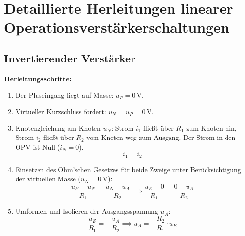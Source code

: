 \documentclass[11pt,a4paper]{article}
\begin{document}
\newpage

\section{Detaillierte Herleitungen linearer Operationsverstärkerschaltungen}

\subsection{Invertierender Verstärker}
\textbf{Herleitungsschritte:}
\begin{enumerate}
    \item Der Pluseingang liegt auf Masse: $u_P = 0\,\text{V}$.
    \item Virtueller Kurzschluss fordert: $u_N = u_P = 0\,\text{V}$.
    \item Knotengleichung am Knoten $u_N$: Strom $i_1$ fließt über $R_1$ zum Knoten hin, Strom $i_2$ fließt über $R_2$ vom Knoten weg zum Ausgang. Der Strom in den OPV ist Null ($i_N = 0$).
    \begin{equation}
    i_1 = i_2
    \end{equation}
    \item Einsetzen des Ohm'schen Gesetzes für beide Zweige unter Berücksichtigung der virtuellen Masse ($u_N = 0\,\text{V}$):
    \begin{equation}
    \frac{u_E - u_N}{R_1} = \frac{u_N - u_A}{R_2} \implies \frac{u_E - 0}{R_1} = \frac{0 - u_A}{R_2}
    \end{equation}
    \item Umformen und Isolieren der Ausgangsspannung $u_A$:
    \begin{equation}
    \frac{u_E}{R_1} = -\frac{u_A}{R_2} \implies u_A = -\frac{R_2}{R_1} \cdot u_E
    \end{equation}
\end{enumerate}
\end{document}
